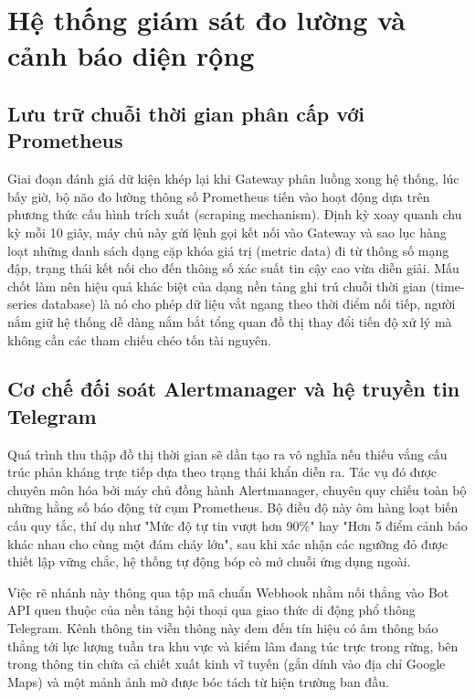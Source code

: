 \documentclass[12pt,a4paper]{report}
\begin{document}
\section{Hệ thống giám sát đo lường và cảnh báo diện rộng}

\subsection{Lưu trữ chuỗi thời gian phân cấp với Prometheus}

Giai đoạn đánh giá dữ kiện khép lại khi Gateway phân luồng xong hệ thống, lúc bấy giờ, bộ não đo lường thông số Prometheus \cite{prometheus} tiến vào hoạt động dựa trên phương thức cấu hình trích xuất (scraping mechanism). Định kỳ xoay quanh chu kỳ mỗi 10 giây, máy chủ này gửi lệnh gọi kết nối vào Gateway và sao lục hàng loạt những danh sách dạng cặp khóa giá trị (metric data) đi từ thông số mạng đập, trạng thái kết nối cho đến thông số xác suất tin cậy cao vừa diễn giải. Mấu chốt làm nên hiệu quả khác biệt của dạng nền tảng ghi trú chuỗi thời gian (time-series database) là nó cho phép dữ liệu vắt ngang theo thời điểm nối tiếp, người nắm giữ hệ thống dễ dàng nắm bắt tổng quan đồ thị thay đổi tiến độ xử lý mà không cần các tham chiếu chéo tốn tài nguyên.

\subsection{Cơ chế đối soát Alertmanager và hệ truyền tin Telegram}

Quá trình thu thập đồ thị thời gian sẽ dần tạo ra vô nghĩa nếu thiếu vắng cấu trúc phản kháng trực tiếp dựa theo trạng thái khẩn diễn ra. Tác vụ đó được chuyên môn hóa bởi máy chủ đồng hành Alertmanager, chuyên quy chiếu toàn bộ những hằng số báo động từ cụm Prometheus. Bộ điều độ này ôm hàng loạt biến cấu quy tắc, thí dụ như "Mức độ tự tin vượt hơn 90\%" hay "Hơn 5 điểm cảnh báo khác nhau cho cùng một đám cháy lớn", sau khi xác nhận các ngưỡng đỏ được thiết lập vững chắc, hệ thống tự động bóp cò mở chuỗi ứng dụng ngoài. 

Việc rẽ nhánh này thông qua tập mã chuẩn Webhook nhằm nối thẳng vào Bot API quen thuộc của nền tảng hội thoại qua giao thức di động phổ thông Telegram. Kênh thông tin viễn thông này đem đến tín hiệu có âm thông báo thẳng tới lực lượng tuần tra khu vực và kiểm lâm đang túc trực trong rừng, bên trong thông tin chứa cả chiết xuất kinh vĩ tuyến (gắn dính vào địa chỉ Google Maps) và một mảnh ảnh mờ được bóc tách từ hiện trường ban đầu.
\end{document}
